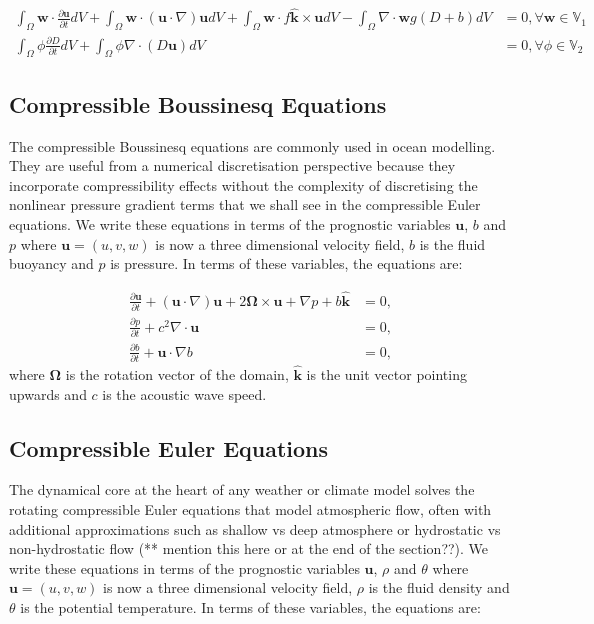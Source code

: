 \documentclass[11pt, a4paper]{article}
\def\MM#1{\boldsymbol{#1}}
\newcommand{\pp}[2]{\frac{\partial #1}{\partial #2}}
\begin{document}
\begin{align}
  \int_\Omega\MM{w}\cdot\pp{\MM{u}}{t}dV + \int_\Omega\MM{w}\cdot(\MM{u}\cdot\nabla)\MM{u} dV + \int_\Omega\MM{w}\cdot f\hat{\MM{k}}\times\MM{u}dV - \int_\Omega \nabla\cdot\MM{w} g(D+b) dV &= 0, \forall \MM{w}\in\mathbb{V}_1 \\
  \int_\Omega\phi\pp{D}{t}dV + \int_\Omega\phi\nabla\cdot(D\MM{u}) dV &= 0, \forall \phi\in\mathbb{V}_2
\end{align}

\subsection{Compressible Boussinesq Equations}
The compressible Boussinesq equations are commonly used in ocean
modelling. They are useful from a numerical discretisation perspective
because they incorporate compressibility effects without the
complexity of discretising the nonlinear pressure gradient terms that
we shall see in the compressible Euler equations. We write these
equations in terms of the prognostic variables $\MM{u}$, $b$ and
$p$ where $\MM{u}=(u, v, w)$ is now a three dimensional velocity
field, $b$ is the fluid buoyancy and $p$ is pressure. In terms of
these variables, the equations are:

\begin{align}
  \pp{\MM{u}}{t} + 
  (\MM{u}\cdot\nabla)\MM{u} +
  2\MM{\Omega}\times \MM{u} + \nabla p + b\hat{\MM{k}} & = 0, \\
  \pp{p}{t} + c^2\nabla\cdot\MM{u} & = 0, \\
  \pp{b}{t} + \MM{u}\cdot\nabla b & = 0,
\end{align}
where $\MM{\Omega}$ is the rotation vector of the domain,
$\hat{\MM{k}}$ is the unit vector pointing upwards and $c$ is the
acoustic wave speed.

\subsection{Compressible Euler Equations}
The dynamical core at the heart of any weather or climate model solves
the rotating compressible Euler equations that model atmospheric flow,
often with additional approximations such as shallow vs deep
atmosphere or hydrostatic vs non-hydrostatic flow (** mention this
here or at the end of the section??). We write these equations in
terms of the prognostic variables $\MM{u}$, $\rho$ and $\theta$ where
$\MM{u}=(u, v, w)$ is now a three dimensional velocity field, $\rho$
is the fluid density and $\theta$ is the potential temperature. In
terms of these variables, the equations are:
\end{document}
